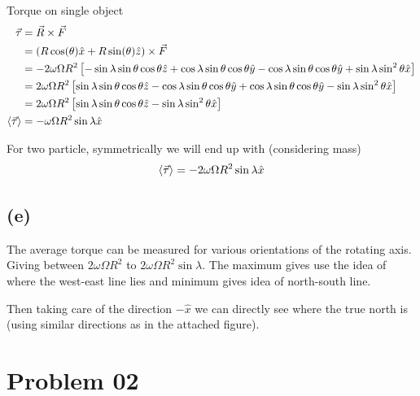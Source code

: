 \documentclass[letter, 10pts]{article}
\begin{document}
Torque on single object 
\begin{align*}
\vec{\tau} &=
\vec{R} \times \vec{F} \\
&=
(R \cos(\theta) \hat{x} + R \sin(\theta) \hat{z}) \times  \vec{F} 
\\
&= 
- 2 \omega \Omega R^2 
\left[ -
 \sin \lambda \sin \theta \cos \theta   \hat{z}  
 + 
 \cos\lambda \sin \theta \cos \theta \hat{y} 
 - 
 \cos \lambda \sin \theta \cos \theta \hat{y} 
 + 
 \sin \lambda \sin ^2 \theta \hat{x}
\right]
\\
&= 
2 \omega \Omega R^2 
\left[ 
 \sin \lambda \sin \theta \cos \theta   \hat{z}  
 - 
 \cos\lambda \sin \theta \cos \theta \hat{y} 
 + 
 \cos \lambda \sin \theta \cos \theta \hat{y} 
 - 
 \sin \lambda \sin ^2 \theta \hat{x}
\right]
\\
&= 
2 \omega \Omega R^2 
\left[ 
 \sin \lambda \sin \theta \cos \theta   \hat{z}  
 - 
 \sin \lambda \sin ^2 \theta \hat{x}
\right]
\\
\braket{ \vec{\tau} }&= -  
 \omega \Omega R^2 \sin \lambda  \hat{x}
\\
\end{align*} 

For two particle, symmetrically we will end up with  (considering mass)
\[
\braket{ \vec{\tau}} = - 2 \omega \Omega R^2 \sin \lambda \hat{x}
\] 




\subsection*{(e)} 
The average torque can be measured for various orientations of the rotating axis. Giving between 
$2 \omega \Omega R^2$ to $ 2 \omega \Omega R^2 \sin \lambda $. The maximum gives use the idea of where the west-east line lies and minimum gives idea of  north-south line. 

Then taking care of the direction $- \hat{x}$ we can directly see where the true north is (using similar directions as in the attached figure).









\section*{Problem 02}
\end{document}
